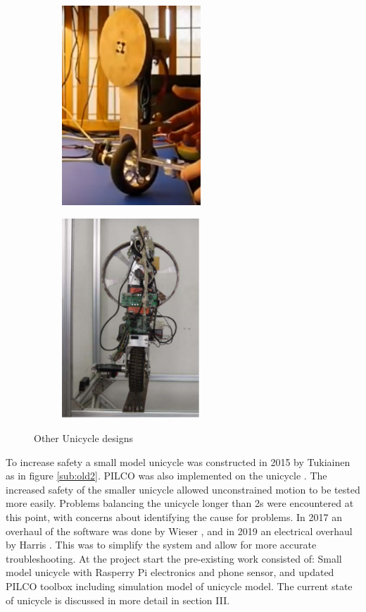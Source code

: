 \documentclass[twoside,twocolumn,12pt]{article}
\begin{document}
\begin{figure}[hb!]
  \centering
  \begin{subfigure}[t]{0.325\textwidth}
    \includegraphics[width=\linewidth,height=7.5cm]{other1}
   \caption{\cite{other1}}
  \label{sub:oother1}
  \end{subfigure}
  \begin{subfigure}[t]{0.325\textwidth}
    \includegraphics[width=\linewidth,height=7.5cm]{other3}
    \caption{\cite{other2}}
  \label{sub:other2}
  \end{subfigure}
  \caption{Other Unicycle designs}
  \label{fig:otheruni}
\end{figure}
To increase safety a small model unicycle was constructed in 2015 by Tukiainen \cite{tuk} as in figure \ref{sub:old2}. PILCO was also implemented on the unicycle \cite{pilco}. The increased safety of the smaller unicycle allowed unconstrained motion to be tested more easily. Problems balancing the unicycle longer than 2s were encountered at this point, with concerns about identifying the cause for problems. In 2017 an overhaul of the software was done by Wieser \cite{eric}, and in 2019 an electrical overhaul by Harris \cite{arsalan}. This was to simplify the system and allow for more accurate troubleshooting. 
\newline
At the project start the pre-existing work consisted of: Small model unicycle with Rasperry Pi electronics and phone sensor, and updated PILCO toolbox including simulation model of unicycle model. The current state of unicycle is discussed in more detail in section III. 
\end{document}
